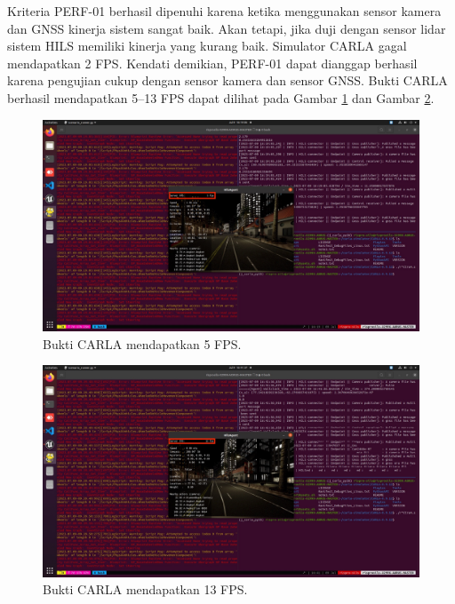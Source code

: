 Kriteria PERF-01 berhasil dipenuhi karena ketika menggunakan sensor kamera dan
GNSS kinerja sistem sangat baik. Akan tetapi, jika duji dengan sensor lidar
sistem HILS memiliki kinerja yang kurang baik. Simulator CARLA gagal mendapatkan
2 FPS. Kendati demikian, PERF-01 dapat dianggap berhasil karena pengujian cukup
dengan sensor kamera dan  sensor GNSS. Bukti CARLA berhasil mendapatkan 5--13
FPS dapat dilihat pada Gambar \ref{chapter-4-fig-carla-5-fps} dan Gambar
\ref{chapter-4-fig-carla-13-fps}.
\begin{figure}[!htbp]
	\includegraphics[width=1.0\textwidth,trim={22.5cm 10.5cm 22.5cm 12cm},clip]{resources/chapter-4/CARLA-5FPS.JPG}
	\caption{Bukti CARLA mendapatkan 5 FPS.}
	\label{chapter-4-fig-carla-5-fps}
\end{figure}
\begin{figure}[!htbp]
	\includegraphics[width=1.0\textwidth,trim={22.5cm 10.5cm 22.5cm 12cm},clip]{resources/chapter-4/CARLA-13FPS.JPG}
	\caption{Bukti CARLA mendapatkan 13 FPS.}
	\label{chapter-4-fig-carla-13-fps}
\end{figure}

